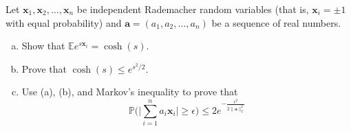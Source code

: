\documentclass[12pt,letterpaper,cm]{hmcpset}
\newcommand\x{\boldsymbol{x}}
\renewcommand\a{\boldsymbol{a}}
\newcommand\E{\mathbb{E}}
\renewcommand\P{\mathbb{P}}
\begin{document}
\begin{problem}[1]
    Let $\x_1,\x_2,\ldots,\x_n$ be independent Rademacher random variables
    (that is, $\x_i = \pm 1$ with equal probability) and $\a=(a_1,a_2,\ldots,a_n)$
    be a sequence of real numbers.
\begin{enumerate}[(a)]
    \item Show that $\E e^{s \x_i} = \cosh(s)$.
    \item Prove that $\cosh(s) \leq e^{s^2/2}$.
    \item Use (a), (b), and Markov's inequality to prove that $$\P\biggl(\biggl|\sum_{i=1}^n a_i \x_i\biggr| \geq \epsilon\biggr) \leq 2e^{-\tfrac{\epsilon^2}{2\|\a\|_2^2}}$$
\end{enumerate}
\end{problem}

\begin{solution}
    \vfill
\end{solution}
\clearpage
\end{document}
